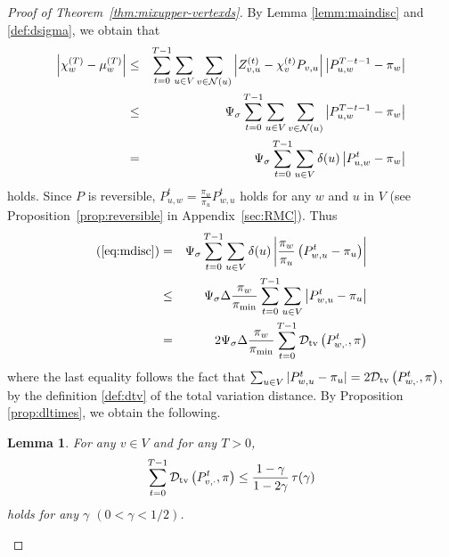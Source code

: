\documentclass[letter, 11pt]{article}
\newcommand{\1}{\mbox{1}\hspace{-0.25em}\mbox{l}}
\newtheorem{lemma}[theorem]{Lemma}
\begin{document}
\begin{proof}[Proof of Theorem~\ref{thm:mixupper-vertexds}]
By Lemma \ref{lemm:maindisc} and \eqref{def:dsigma}, we obtain that
\begin{eqnarray}
\label{eq:mdisc1}
\left| \chi ^{(T)}_w-\mu ^{(T)}_w\right| 
 &\leq & \sum_{t=0}^{T-1} \sum_{u\in V} \sum_{v\in {\cal N}(u)}
         \left| Z_{v, u}^{(t)}-\chi_v^{(t)}P_{v, u}\right|  \left| P^{T-t-1}_{u, w}-\pi_w \right| \\ &\leq & \Psi_\sigma \sum_{t=0}^{T-1}\sum_{u\in V}\sum_{v\in {\cal N}(u)} \left| P^{T-t-1}_{u, w}-\pi_w \right| \nonumber \\
\label{eq:mdisc} &=& \Psi_\sigma \sum_{t=0}^{T-1}\sum_{u\in V}\delta(u)\left| P^{t}_{u, w}-\pi_w \right| 
\end{eqnarray}
  holds. 
 Since $P$ is reversible, 
  $P^t_{u, w}=\frac{\pi_w}{\pi_u}P^t_{w, u}$ holds for any $w$ and $u$ in $V$ 
 (see Proposition~\ref{prop:reversible} in Appendix~\ref{sec:RMC}). 
 Thus
\begin{eqnarray}
\label{eq:mdisc3}
(\ref{eq:mdisc})
 &=&
  \Psi_\sigma \sum_{t=0}^{T-1}\sum_{u\in V} \delta(u)
  \left| \frac{\pi_w}{\pi_u}\left( P^{t}_{w, u}-\pi_u\right)\right| \nonumber \\
 &\leq& 
  \Psi_\sigma \Delta \frac{\pi_w}{\pi_{\min}}  \sum_{t=0}^{T-1}\sum_{u\in V} 
  \left| P^{t}_{w, u}-\pi_u \right| \nonumber \\
 &=&
  2\Psi_\sigma \Delta \frac{\pi_w}{\pi_{\min}}\sum_{t=0}^{T-1}
  {\cal D}_{\rm tv}\left( P^t_{w, \cdot}, \pi \right) 
\label{eq:mdisc4}
\end{eqnarray}
  where the last equality follows 
  the fact that 
   $\sum_{u\in V}|P^t_{w, u}-\pi_u| = 2{\cal D}_{\rm tv}\left( P^t_{w, \cdot}, \pi \right)$, 
   by the definition \eqref{def:dtv} of the total variation distance. 
By Proposition \ref{prop:dltimes}, we obtain the following. 
\begin{lemma}
\label{lemm:dtsum}
For any $v\in V$ and for any $T>0$, 
\begin{eqnarray*}
 \sum_{t=0}^{T-1} {\cal D}_{\rm tv}\left( P^t_{v, \cdot}, \pi \right) 
 \leq \frac{1-\gamma }{1-2\gamma }\, \tau(\gamma )
\end{eqnarray*}
holds for any $\gamma$ $(0<\gamma <1/2)$. 
\end{lemma} 


\end{proof}
\end{document}
